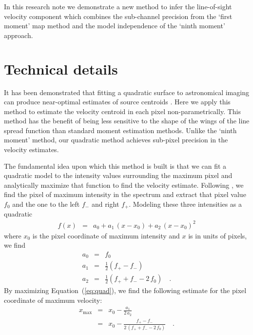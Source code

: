 \documentclass[rnaas]{aastex62}
\renewcommand{\eqref}[1]{\ref{eq:#1}}
\newcommand{\Eq}[1]{Equation~(\eqref{#1})}
\newcommand{\eqlabel}[1]{\label{eq:#1}}
\begin{document}
In this research note we demonstrate a new method to infer the line-of-sight velocity component which combines the sub-channel precision from the `first moment' map method and the model independence of the `ninth moment' approach.

\section{Technical details}

It has been demonstrated that fitting a quadratic surface to astronomical
imaging can produce near-optimal estimates of source centroids
\citep{Vakili:2016}.
Here we apply this method to estimate the velocity centroid in each pixel
non-parametrically.
This method has the benefit of being less sensitive to the shape of the wings
of the line spread function than standard moment estimation methods.
Unlike the `ninth moment' method, our quadratic method achieves sub-pixel
precision in the velocity estimates.

The fundamental idea upon which this method is built is that we can fit a
quadratic model to the intensity values surrounding the maximum pixel and
analytically maximize that function to find the velocity estimate.
Following \citet{Vakili:2016}, we find the pixel of maximum intensity in the
spectrum and extract that pixel value $f_0$ and the one to the left $f_-$ and
right $f_+$.
Modeling these three intensities as a quadratic
\begin{eqnarray}
f(x) &=& a_0 + a_1\,(x-x_0) + a_2\,{(x-x_0)}^2
\eqlabel{quad}
\end{eqnarray}
where $x_0$ is the pixel coordinate of maximum intensity and $x$ is in units
of pixels, we find
\begin{eqnarray}
a_0 &=& f_0 \\
a_1 &=& \frac{1}{2}(f_+ - f_-) \\
a_2 &=& \frac{1}{2}(f_+ + f_- - 2\,f_0) \quad.
\end{eqnarray}
By maximizing \Eq{quad}, we find the following estimate for the pixel
coordinate of maximum velocity:
\begin{eqnarray}
x_\mathrm{max} &=& x_0 - \frac{a_1}{2\,a_2} \\
    &=& x_0 - \frac{f_+ - f_-}{2\,(f_+ + f_- - 2\,f_0)} \quad.
\end{eqnarray}
\end{document}
